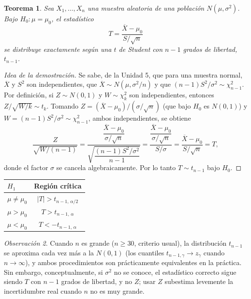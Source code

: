\documentclass[11pt,a4paper]{article}
\theoremstyle{plain}
\newtheorem{teorema}{Teorema}[section]
\theoremstyle{definition}
\theoremstyle{remark}
\newtheorem{observacion}[teorema]{Observación}
\begin{document}
\begin{teorema}
Sea $X_1,\dots,X_n$ una muestra aleatoria de una población $N(\mu,\sigma^2)$. Bajo $H_0:\mu=\mu_0$, el estadístico
\[
T=\frac{\overline X-\mu_0}{S/\sqrt n}
\]
se distribuye exactamente según una $t$ de Student con $n-1$ grados de libertad, $t_{n-1}$.
\end{teorema}

\begin{proof}[Idea de la demostración]
Se sabe, de la Unidad 5, que para una muestra normal, $\overline X$ y $S^2$ son independientes, que $\overline X\sim N(\mu,\sigma^2/n)$ y que $(n-1)S^2/\sigma^2\sim\chi^2_{n-1}$. Por definición, si $Z\sim N(0,1)$ y $W\sim\chi^2_{k}$ son independientes, entonces $Z/\sqrt{W/k}\sim t_k$. Tomando $Z=(\overline X-\mu_0)/(\sigma/\sqrt n)$ (que bajo $H_0$ es $N(0,1)$) y $W=(n-1)S^2/\sigma^2\sim\chi^2_{n-1}$, ambos independientes, se obtiene
\[
\frac{Z}{\sqrt{W/(n-1)}} = \frac{\dfrac{\overline X-\mu_0}{\sigma/\sqrt n}}{\sqrt{\dfrac{(n-1)S^2/\sigma^2}{n-1}}} = \frac{\dfrac{\overline X-\mu_0}{\sigma/\sqrt n}}{S/\sigma} = \frac{\overline X-\mu_0}{S/\sqrt n} = T,
\]
donde el factor $\sigma$ se cancela algebraicamente. Por lo tanto $T\sim t_{n-1}$ bajo $H_0$.
\end{proof}

\begin{table}[h]
\centering
\small
\begin{tabular}{@{}lc@{}}
\toprule
$H_1$ & Región crítica \\
\midrule
$\mu\neq\mu_0$ & $|T|>t_{n-1,\,\alpha/2}$ \\
$\mu>\mu_0$ & $T>t_{n-1,\,\alpha}$ \\
$\mu<\mu_0$ & $T<-t_{n-1,\,\alpha}$ \\
\bottomrule
\end{tabular}
\end{table}

\begin{observacion}
Cuando $n$ es grande ($n\ge30$, criterio usual), la distribución $t_{n-1}$ se aproxima cada vez más a la $N(0,1)$ (los cuantiles $t_{n-1,\gamma}\to z_\gamma$ cuando $n\to\infty$), y ambos procedimientos son prácticamente equivalentes en la práctica. Sin embargo, conceptualmente, si $\sigma^2$ no se conoce, el estadístico correcto sigue siendo $T$ con $n-1$ grados de libertad, y no $Z$; usar $Z$ subestima levemente la incertidumbre real cuando $n$ no es muy grande.
\end{observacion}
\end{document}
